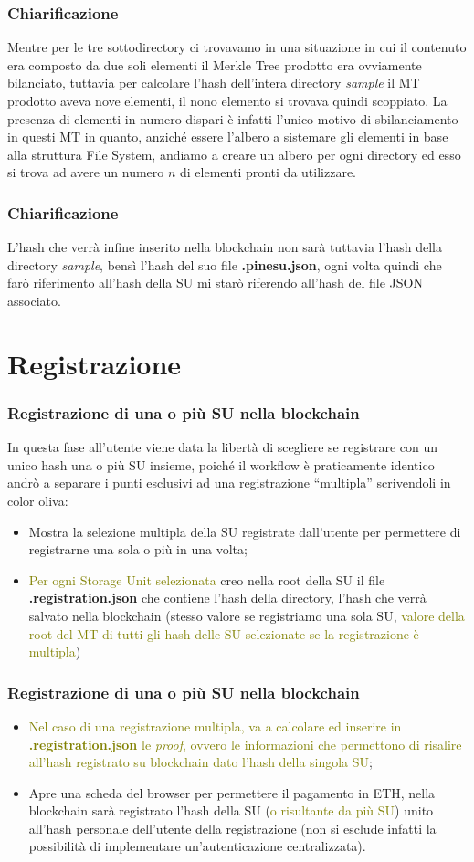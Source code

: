 \documentclass{beamer}
\begin{document}
\begin{frame}
	\frametitle{Chiarificazione}
	Mentre per le tre sottodirectory ci trovavamo in una situazione in cui il contenuto era composto da due soli elementi il Merkle Tree prodotto era ovviamente bilanciato, tuttavia per calcolare l'hash dell'intera directory \emph{sample} il MT prodotto aveva nove elementi, il nono elemento si trovava quindi scoppiato. La presenza di elementi in numero dispari è infatti l'unico motivo di sbilanciamento in questi MT in quanto, anziché essere l'albero a sistemare gli elementi in base alla struttura File System, andiamo a creare un albero per ogni directory ed esso si trova ad avere un numero \(n\) di elementi pronti da utilizzare. 
\end{frame}
\begin{frame}
	\frametitle{Chiarificazione}
	L'hash che verrà infine inserito nella blockchain non sarà tuttavia l'hash della directory \emph{sample}, bensì l'hash del suo file \textbf{.pinesu.json}, ogni volta quindi che farò riferimento all'hash della SU mi starò riferendo all'hash del file JSON associato.
\end{frame}
\section{Registrazione}
\begin{frame}
	\frametitle{Registrazione di una o più SU nella blockchain}
	In questa fase all'utente viene data la libertà di scegliere se registrare con un unico hash una o più SU insieme, poiché il workflow è praticamente identico andrò a separare i punti esclusivi ad una registrazione “multipla” scrivendoli in color oliva:
	\begin{itemize}
		\item Mostra la selezione multipla della SU registrate dall'utente per permettere di registrarne una sola o più in una volta;
		\item \textcolor{olive}{Per ogni Storage Unit selezionata} creo nella root della SU il file \textbf{.registration.json} che contiene l'hash della directory, l'hash che verrà salvato nella blockchain (stesso valore se registriamo una sola SU, \textcolor{olive}{valore della root del MT di tutti gli hash delle SU selezionate se la registrazione è multipla})
	\end{itemize}
\end{frame}
\begin{frame}
	\frametitle{Registrazione di una o più SU nella blockchain}
	\begin{itemize}
		\item \textcolor{olive}{Nel caso di una registrazione multipla, va a calcolare ed inserire in \textbf{.registration.json} le \emph{proof}, ovvero le informazioni che permettono di risalire all'hash registrato su blockchain dato l'hash della singola SU};
		\item Apre una scheda del browser per permettere il pagamento in ETH, nella blockchain sarà registrato l'hash della SU (\textcolor{olive}{o risultante da più SU}) unito all'hash personale dell'utente della registrazione (non si esclude infatti la possibilità di implementare un'autenticazione centralizzata).
	\end{itemize}
\end{frame}
\end{document}
